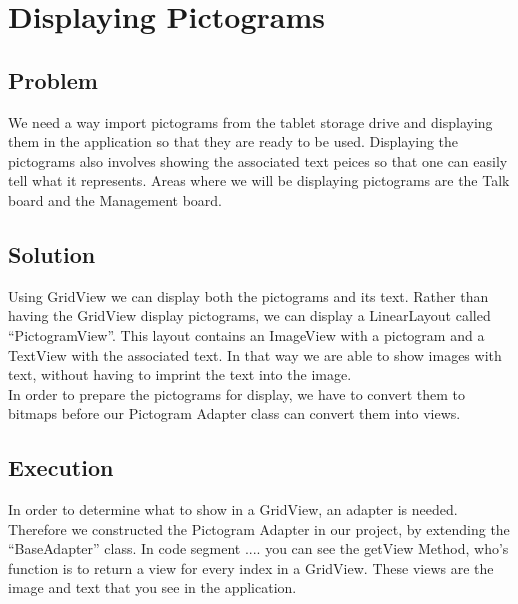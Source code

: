 \section{Displaying Pictograms} %

\subsection{Problem}
We need a way import pictograms from the tablet storage drive and displaying them in the application so that they are ready to be used.
Displaying the pictograms also involves showing the associated text peices so that one can easily tell what it represents.
Areas where we will be displaying pictograms are the Talk board and the Management board.

\subsection{Solution}
Using GridView we can display both the pictograms and its text.
Rather than having the GridView display pictograms, we can display a LinearLayout called ``PictogramView''.
This layout contains an ImageView with a pictogram and a TextView with the associated text.
In that way we are able to show images with text, without having to imprint the text into the image.\\

In order to prepare the pictograms for display, we have to convert them to bitmaps before our Pictogram Adapter class can convert them into views.

\subsection{Execution}
In order to determine what to show in a GridView, an adapter is needed. Therefore we constructed the Pictogram Adapter in our project, by extending the ``BaseAdapter'' class.
In code segment .... you can see the getView Method, who's function is to return a view for every index in a GridView.
These views are the image and text that you see in the application.\\


